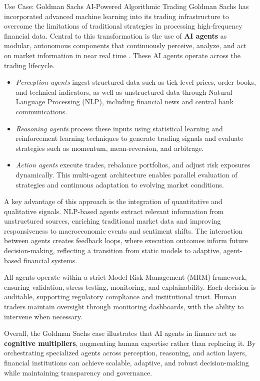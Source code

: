 \documentclass{article}
\begin{document}
\begin{usecasebox}{Use Case: Goldman Sachs AI-Powered Algorithmic Trading}
Goldman Sachs has incorporated advanced machine learning into its trading infrastructure to overcome the limitations of traditional strategies in processing high-frequency financial data. Central to this transformation is the use of \textbf{AI agents} as modular, autonomous components that continuously perceive, analyze, and act on market information in near real time \cite{cnbc_gs2025}. These AI agents operate across the trading lifecycle. 
\begin{itemize}
    \item \textit{Perception agents} ingest structured data such as tick-level prices, order books, and technical indicators, as well as unstructured data through Natural Language Processing (NLP), including financial news and central bank communications. 
    \item \textit{Reasoning agents} process these inputs using statistical learning and reinforcement learning techniques to generate trading signals and evaluate strategies such as momentum, mean-reversion, and arbitrage. 
    \item \textit{Action agents} execute trades, rebalance portfolios, and adjust risk exposures dynamically. This multi-agent architecture enables parallel evaluation of strategies and continuous adaptation to evolving market conditions.
\end{itemize}

A key advantage of this approach is the integration of quantitative and qualitative signals. NLP-based agents extract relevant information from unstructured sources, enriching traditional market data and improving responsiveness to macroeconomic events and sentiment shifts. The interaction between agents creates feedback loops, where execution outcomes inform future decision-making, reflecting a transition from static models to adaptive, agent-based financial systems.

All agents operate within a strict Model Risk Management (MRM) framework, ensuring validation, stress testing, monitoring, and explainability. Each decision is auditable, supporting regulatory compliance and institutional trust. Human traders maintain oversight through monitoring dashboards, with the ability to intervene when necessary.

Overall, the Goldman Sachs case illustrates that AI agents in finance act as \textbf{cognitive multipliers}, augmenting human expertise rather than replacing it. By orchestrating specialized agents across perception, reasoning, and action layers, financial institutions can achieve scalable, adaptive, and robust decision-making while maintaining transparency and governance.



\end{usecasebox}
\end{document}
